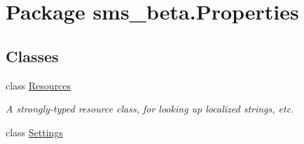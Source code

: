 \hypertarget{namespacesms__beta_1_1_properties}{
\section{Package sms\_\-beta.Properties}
\label{namespacesms__beta_1_1_properties}
}
\subsection*{Classes}
\begin{DoxyCompactItemize}
\item 
class \hyperlink{classsms__beta_1_1_properties_1_1_resources}{Resources}
\begin{DoxyCompactList}\small\item\em A strongly-\/typed resource class, for looking up localized strings, etc. \item\end{DoxyCompactList}\item 
class \hyperlink{classsms__beta_1_1_properties_1_1_settings}{Settings}
\end{DoxyCompactItemize}
